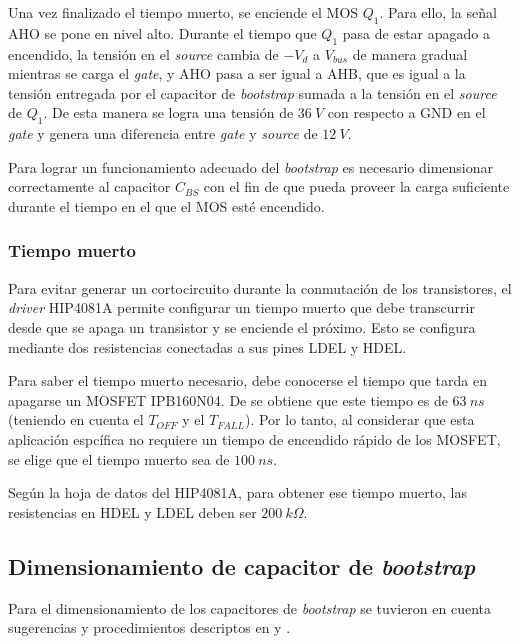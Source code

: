 Una vez finalizado el tiempo muerto, se enciende el MOS $Q_1$. Para ello, la señal AHO se pone en nivel alto. Durante el tiempo que $Q_1$ pasa de estar apagado a encendido, la tensión en el \textsl{source} cambia de $-V_d$ a $V_{bus}$ de manera gradual mientras se carga el \textsl{gate}, y AHO pasa a ser igual a AHB, que es igual a la tensión entregada por el capacitor de \textsl{bootstrap} sumada a la tensión en el \textsl{source} de $Q_1$. De esta manera se logra una tensión de $36\:V$ con respecto a GND en el \textsl{gate} y genera una diferencia entre \textsl{gate} y \textsl{source} de $12\:V$.

Para lograr un funcionamiento adecuado del \textsl{bootstrap} es necesario dimensionar correctamente al capacitor $C_{BS}$ con el fin de que pueda proveer la carga suficiente durante el tiempo en el que el MOS esté encendido.

\subsubsection{Tiempo muerto}

\noindent Para evitar generar un cortocircuito durante la conmutación de los transistores, el \textsl{driver} HIP4081A permite configurar un tiempo muerto que debe transcurrir desde que se apaga un transistor y se enciende el próximo. Esto se configura mediante dos resistencias conectadas a sus pines LDEL y HDEL.

\noindent Para saber el tiempo muerto necesario, debe conocerse el tiempo que tarda en apagarse un MOSFET IPB160N04. De \cite{IPB160N04} se obtiene que este tiempo es de $63\:ns$ (teniendo en cuenta el $T_{OFF}$ y el $T_{FALL}$). Por lo tanto, al considerar que esta aplicación espcífica no requiere un tiempo de encendido rápido de los MOSFET, se elige que el tiempo muerto sea de $100\:ns$.

\noindent Según la hoja de datos del HIP4081A, para obtener ese tiempo muerto, las resistencias en HDEL y LDEL deben ser $200\:k\Omega$.

\subsection{Dimensionamiento de capacitor de \textsl{bootstrap}}

\noindent Para el dimensionamiento de los capacitores de \textsl{bootstrap} se tuvieron en cuenta sugerencias y procedimientos descriptos en \cite{HIP4081A_AN9405} y \cite{HIP4081A_FN3659}.


